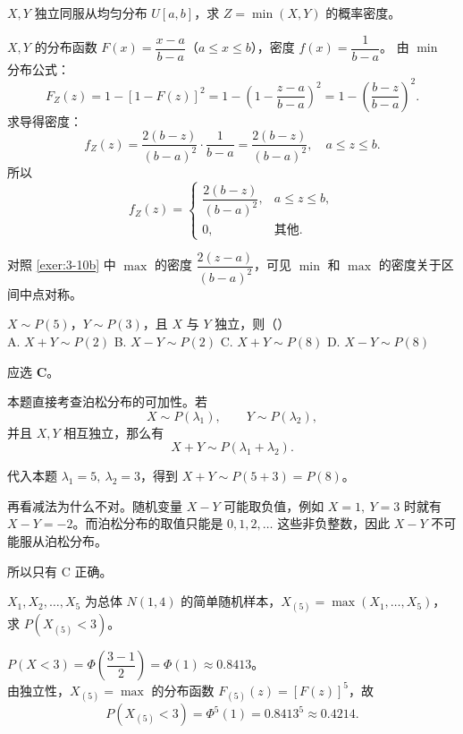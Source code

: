 ﻿\documentclass[lang=cn,11pt]{elegantbook}
\begin{document}
\begin{exercise} \label{exer:3-c16}
$X, Y$ 独立同服从均匀分布 $U[a,b]$，求 $Z = \min(X,Y)$ 的概率密度。
\end{exercise}
\begin{solution}
$X, Y$ 的分布函数 $F(x) = \dfrac{x-a}{b-a}$（$a \leqslant x \leqslant b$），密度 $f(x) = \dfrac{1}{b-a}$。
由 $\min$ 分布公式：
\[
F_Z(z) = 1 - [1-F(z)]^2 = 1 - \left(1 - \frac{z-a}{b-a}\right)^2 = 1 - \left(\frac{b-z}{b-a}\right)^2.
\]
求导得密度：
\[
f_Z(z) = \frac{2(b-z)}{(b-a)^2}\cdot\frac{1}{b-a} = \frac{2(b-z)}{(b-a)^2}, \quad a \leqslant z \leqslant b.
\]
所以
\[
f_Z(z) = \begin{cases} \dfrac{2(b-z)}{(b-a)^2}, & a \leqslant z \leqslant b, \\ 0, & \text{其他}. \end{cases}
\]
\begin{note}
对照 \ref{exer:3-10b} 中 $\max$ 的密度 $\dfrac{2(z-a)}{(b-a)^2}$，可见 $\min$ 和 $\max$ 的密度关于区间中点对称。
\end{note}
\end{solution}

\begin{exercise}[泊松可加性] \label{exer:3-c6b}
$X\sim P(5)$，$Y\sim P(3)$，且 $X$ 与 $Y$ 独立，则（\quad）\\
A. $X+Y\sim P(2)$ \quad B. $X-Y\sim P(2)$ \quad C. $X+Y\sim P(8)$ \quad D. $X-Y\sim P(8)$
\end{exercise}
\begin{solution}
应选 \textbf{C}。

本题直接考查泊松分布的可加性。若
\[
X\sim P(\lambda_1),\qquad Y\sim P(\lambda_2),
\]
并且 \(X,Y\) 相互独立，那么有
\[
X+Y\sim P(\lambda_1+\lambda_2).
\]

代入本题 \(\lambda_1=5,\ \lambda_2=3\)，得到 \(X+Y\sim P(5+3)=P(8)\)。

再看减法为什么不对。随机变量 \(X-Y\) 可能取负值，例如 \(X=1,\ Y=3\) 时就有 \(X-Y=-2\)。而泊松分布的取值只能是 \(0,1,2,\dots\) 这些非负整数，因此 \(X-Y\) 不可能服从泊松分布。

所以只有 C 正确。
\end{solution}


\begin{exercise}[次序统计量的分布] \label{exer:3-c8b}
$X_1,X_2,\dots,X_5$ 为总体 $N(1,4)$ 的简单随机样本，$X_{(5)} = \max(X_1,\dots,X_5)$，求 $P(X_{(5)}<3)$。
\end{exercise}
\begin{solution}
$P(X<3) = \Phi\!\left(\dfrac{3-1}{2}\right) = \Phi(1) \approx 0.8413$。\\
由独立性，$X_{(5)} = \max$ 的分布函数 $F_{(5)}(z) = [F(z)]^5$，故
\[
P(X_{(5)}<3) = \Phi^5(1) = 0.8413^5 \approx 0.4214.
\]
\end{solution}
\end{document}
